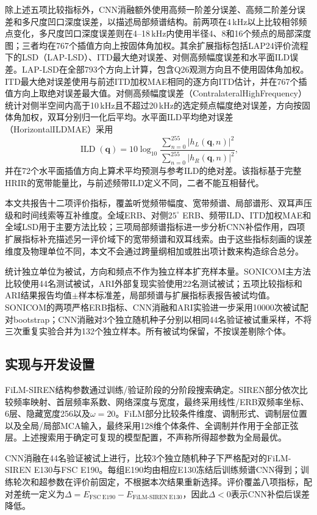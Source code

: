 \documentclass[UTF8,a4paper]{article}
\begin{document}
除上述五项比较指标外，CNN消融额外使用高频一阶差分误差、高频二阶差分误差和多尺度凹口深度误差，以描述局部频谱结构。前两项在4\,kHz以上比较相邻频点变化，多尺度凹口深度误差则在4--18\,kHz内使用半径4、8和16个频点的局部深度图；三者均在767个插值方向上按固体角加权。其余扩展指标包括LAP24评价流程下的LSD（LAP-LSD）\cite{R19}、ITD最大绝对误差、对侧高频幅度误差和水平面ILD误差。LAP-LSD在全部793个方向上计算，包含Q26观测方向且不使用固体角加权。ITD最大绝对误差使用与前述ITD加权MAE相同的逐方向ITD估计，并在767个插值方向上取绝对误差最大值。对侧高频幅度误差（ContralateralHighFrequency）统计对侧半空间内高于10\,kHz且不超过20\,kHz的选定频点幅度绝对误差，方向按固体角加权，双耳分别归一化后平均。水平面ILD平均绝对误差（HorizontalILDMAE）采用
\begin{equation}
\operatorname{ILD}(\mathbf q)=10\log_{10}
\frac{\sum_{n=0}^{255}|h_L(\mathbf q,n)|^2}
     {\sum_{n=0}^{255}|h_R(\mathbf q,n)|^2},
\end{equation}
并在72个水平面插值方向上算术平均预测与参考ILD的绝对差。该指标基于完整HRIR的宽带能量比，与前述频带ILD定义不同，二者不能互相替代。

本文共报告十二项评价指标，覆盖听觉频带幅度、宽带频谱、局部谱形、双耳声压级和时间线索等互补维度。全域ERB、对侧$25^\circ$ ERB、频带ILD、ITD加权MAE和全域LSD用于主要方法比较；三项局部频谱指标进一步分析CNN补偿作用，四项扩展指标补充描述另一评价域下的宽带频谱和双耳线索。由于这些指标刻画的误差维度及物理单位不同，本文不会通过跨量纲相加或胜出项计数来构造综合总分。

统计独立单位为被试，方向和频点不作为独立样本扩充样本量。SONICOM主方法比较使用44名测试被试，ARI外部复现实验使用22名测试被试；五项比较指标和ARI结果报告均值$\pm$样本标准差，局部频谱与扩展指标表报告被试均值。SONICOM的两项严格ERB指标、CNN消融和ARI实验进一步采用10000次被试配对bootstrap；CNN消融对3个独立随机种子分别以相同44名验证被试重采样，不将三次重复实验合并为132个独立样本。所有被试均保留，不按误差剔除个体。

\subsection{实现与开发设置}
FiLM-SIREN结构参数通过训练/验证阶段的分阶段搜索确定。SIREN部分依次比较频率映射、首层频率系数、网络深度与宽度，最终采用线性/ERB双频率坐标、6层、隐藏宽度256以及$\omega=20$。FiLM部分比较条件维度、调制形式、调制层位置以及全局/局部MCA输入，最终采用128维个体条件、全调制并作用于全部正弦层。上述搜索用于确定可复现的模型配置，不声称所得超参数为全局最优。

CNN消融在44名验证被试上进行，比较3个独立随机种子下严格配对的FiLM-SIREN E130与FSC E190。每组E190均由相应E130冻结后训练频谱CNN得到；训练轮次和超参数在评价前固定，不根据本次结果重新选择。评价覆盖八项指标，配对差统一定义为$\Delta=E_{\mathrm{FSC\ E190}}-E_{\mathrm{FiLM\text{-}SIREN\ E130}}$，因此$\Delta<0$表示CNN补偿后误差降低。
\end{document}
